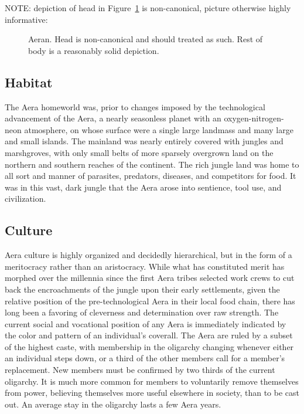 NOTE: depiction of head in Figure~\ref{fig:Aera-body} is non-canonical, picture otherwise highly informative:  

\begin{figure}
\begin{center}
    \caption{Aeran. Head is non-canonical and should treated as such. Rest of body is a reasonably solid depiction.}
    \label{fig:Aera-body}
\end{center}
\end{figure}


\subsection{Habitat}
The Aera homeworld was, prior to changes imposed by the technological
advancement of the Aera, a nearly seasonless planet with an
oxygen-nitrogen-neon atmosphere, on whose surface were a single large
landmass and many large and small islands. The mainland was nearly
entirely covered with jungles and marshgroves, with only small belts
of more sparsely overgrown land on the northern and southern reaches
of the continent. The rich jungle land was home to all sort and manner
of parasites, predators, diseases, and competitors for food. It was in
this vast, dark jungle that the Aera arose into sentience, tool use,
and civilization.

\subsection{Culture}
Aera culture is highly organized and decidedly hierarchical, but in
the form of a meritocracy rather than an aristocracy. While what has
constituted merit has morphed over the millennia since the first Aera
tribes selected work crews to cut back the encroachments of the jungle
upon their early settlements, given the relative position of the
pre-technological Aera in their local food chain, there has long been
a favoring of cleverness and determination over raw strength. The
current social and vocational position of any Aera is immediately
indicated by the color and pattern of an individual's coverall. The
Aera are ruled by a subset of the highest caste, with membership in
the oligarchy changing whenever either an individual steps down, or a
third of the other members call for a member's replacement. New
members must be confirmed by two thirds of the current oligarchy. It
is much more common for members to voluntarily remove themselves from
power, believing themselves more useful elsewhere in society, than to
be cast out. An average stay in the oligarchy lasts a few Aera years.

